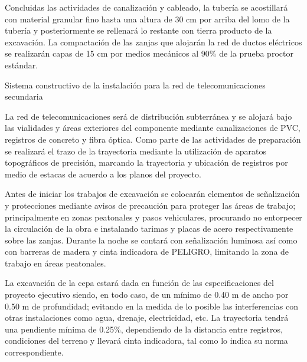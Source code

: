 \documentclass{article}
\begin{document}
\bigskip

Concluidas las actividades de canalización y cableado, la tubería se acostillará con material granular fino hasta una altura de 30 cm por arriba del lomo de la tubería y posteriormente se rellenará lo restante con tierra producto de la excavación. La compactación de las zanjas que alojarán la red de ductos eléctricos se realizarán capas de 15 cm por medios mecánicos al 90\% de la prueba proctor estándar. 


\bigskip


\bigskip

Sistema constructivo de la instalación para la red de telecomunicaciones secundaria


\bigskip

La red de telecomunicaciones será de distribución subterránea y se alojará bajo las vialidades y áreas exteriores del componente mediante canalizaciones de PVC, registros de concreto y fibra óptica. Como parte de las actividades de preparación se realizará el trazo de la trayectoria mediante la utilización de aparatos topográficos de precisión, marcando la trayectoria y ubicación de registros por medio de estacas de acuerdo a los planos del proyecto.


\bigskip

Antes de iniciar los trabajos de excavación se colocarán elementos de señalización y protecciones mediante avisos de precaución para proteger las áreas de trabajo; principalmente en zonas peatonales y pasos vehiculares, procurando no entorpecer la circulación de la obra e instalando tarimas y placas de acero respectivamente sobre las zanjas. Durante la noche se contará con señalización luminosa así como con barreras de madera y cinta indicadora de PELIGRO, limitando la zona de trabajo en áreas peatonales. 


\bigskip

La excavación de la cepa estará dada en función de las especificaciones del proyecto ejecutivo siendo, en todo caso, de un mínimo de 0.40 m de ancho por 0.50 m de profundidad; evitando en la medida de lo posible las interferencias con otras instalaciones como agua, drenaje, electricidad, etc. La trayectoria tendrá una pendiente mínima de 0.25\%, dependiendo de la distancia entre registros, condiciones del terreno y llevará cinta indicadora, tal como lo indica su norma correspondiente.


\bigskip
\end{document}
